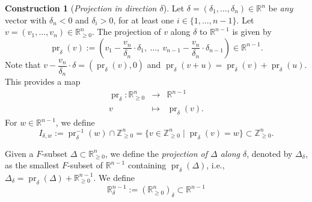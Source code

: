 \documentclass[11pt]{amsart}
\theoremstyle{plain}
\theoremstyle{definition}
\newtheorem{Constr}[Thm]{Construction}
\numberwithin{equation}{section}
\newcommand{\pr}{\operatorname{pr}}
\renewcommand{\d}{\delta}
\newcommand{\D}{\Delta}
\newcommand{\RR}{\mathbb R}
\newcommand{\ZZ}{{\mathbb Z}}
\newcommand{\gqz}{{\geq 0}}
\renewcommand{\(}{(\!(}
\renewcommand{\)}{)\!)}
\begin{document}
\begin{Constr} [\em Projection in direction $ \d $]
	Let $ \d = (\d_1, \ldots , \d_n )\in \RR^{n} $ be {\em any} vector with $ \d_n < 0 $ and $ \d_i > 0 $, for at least one $ i \in \{ 1, \ldots, n- 1 \} $. 
	Let $ v = (v_1, \ldots, v_n) \in \RR^n_\gqz $.
	The projection of $ v $ along $ \d $ to $ \RR^{n-1}  $ is given by
	\[
		\pr_\d (v) := \left( v_1 - \frac{v_n}{\d_n} \cdot \d_1, \ \ldots, \ v_{n-1} - \frac{v_n}{\d_n} \cdot  \d_{n-1}\right) \in \RR^{n-1}.
	\]
	Note that $ v - \dfrac{v_n}{\d_n} \cdot \d = ( \pr_\d (v), 0 ) $ and $ \pr_\d (v+u) = \pr_\d (v) + \pr_\d (u) $.
	This provides a map
	\[
		\begin{array}{rcl}
			\pr_\d: \RR^{n}_\gqz & \longrightarrow & \RR^{n-1}	
			\\[3pt]
			v & \mapsto & \pr_\d (v).
		\end{array}
	\]
	For $ w \in \RR^{n-1} $, we define 
	\[
		I_{\d,w} := \pr_\d^{-1}(w) \cap \ZZ^n_\gqz = \{ v \in \ZZ^n_\gqz \mid \pr_\d (v) = w \} \subset \ZZ^n_\gqz.
	\]
	
	Given a $ F $-subset $ \D \subset \RR^n_\gqz $, we define the {\em projection of $  \D $ along $ \d $}, denoted by $\D_\d $, 
	as the smallest $ F $-subset of $ \RR^{n-1} $ containing $ \pr_\d ( \D) $,
	i.e.,
	$
		\D_\d = \pr_\d (\D) + \RR^{n-1}_\gqz. %
	$
		We define 
		\[
			\RR^{n-1}_\d := (\RR^n_{\geq 0})_\delta \subset \RR^{n-1}
		\]
\end{Constr} 
\end{document}
